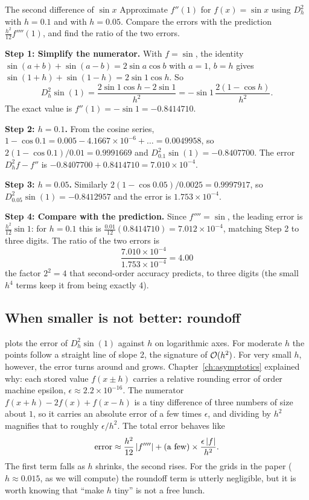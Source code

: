 \begin{sample}{The second difference of $\sin x$}
Approximate $f''(1)$ for $f(x)=\sin x$ using $D_h^2$ with $h=0.1$ and with $h=0.05$. Compare the errors with the prediction $\tfrac{h^2}{12}f''''(1)$, and find the ratio of the two errors.

\textbf{Step 1: Simplify the numerator.} With $f=\sin$, the identity $\sin(a+b)+\sin(a-b)=2\sin a\cos b$ with $a=1$, $b=h$ gives $\sin(1+h)+\sin(1-h)=2\sin 1\cos h$. So
\begin{equation*}
D_h^2\sin(1)=\frac{2\sin1\cos h-2\sin1}{h^2}=-\sin1\,\frac{2(1-\cos h)}{h^2}.
\end{equation*}
The exact value is $f''(1)=-\sin1=-0.8414710$.

\textbf{Step 2: $h=0.1$.} From the cosine series, $1-\cos0.1=0.005-4.1667\times10^{-6}+\dots=0.0049958$, so $2(1-\cos0.1)/0.01=0.9991669$ and $D_{0.1}^2\sin(1)=-0.8407700$. The error $D_h^2f-f''$ is $-0.8407700+0.8414710=7.010\times10^{-4}$.

\textbf{Step 3: $h=0.05$.} Similarly $2(1-\cos0.05)/0.0025=0.9997917$, so $D_{0.05}^2\sin(1)=-0.8412957$ and the error is $1.753\times10^{-4}$.

\textbf{Step 4: Compare with the prediction.} Since $f''''=\sin$, the leading error is $\tfrac{h^2}{12}\sin1$: for $h=0.1$ this is $\tfrac{0.01}{12}(0.8414710)=7.012\times10^{-4}$, matching Step 2 to three digits. The ratio of the two errors is
\begin{equation*}
\boxed{\frac{7.010\times10^{-4}}{1.753\times10^{-4}}=4.00}
\end{equation*}
the factor $2^2=4$ that second-order accuracy predicts, to three digits (the small $h^4$ terms keep it from being exactly 4).
\end{sample}

\subsection{When smaller is not better: roundoff}

 plots the error of $D_h^2\sin(1)$ against $h$ on logarithmic axes. For moderate $h$ the points follow a straight line of slope 2, the signature of $\mathcal{O}(h^2)$. For very small $h$, however, the error turns around and grows. Chapter~\ref{ch:asymptotics} explained why: each stored value $f(x\pm h)$ carries a relative rounding error of order machine epsilon, $\epsilon\approx2.2\times10^{-16}$. The numerator $f(x+h)-2f(x)+f(x-h)$ is a tiny difference of three numbers of size about $1$, so it carries an absolute error of a few times $\epsilon$, and dividing by $h^2$ magnifies that to roughly $\epsilon/h^2$. The total error behaves like
\begin{equation}
\text{error}\approx\frac{h^2}{12}\left\lvert f''''\right\rvert+(\text{a few})\times\frac{\epsilon\left\lvert f\right\rvert}{h^2}.
\label{eq:finite-differences-roundoff}
\end{equation}
The first term falls as $h$ shrinks, the second rises. For the grids in the paper ($h\approx0.015$, as we will compute) the roundoff term is utterly negligible, but it is worth knowing that ``make $h$ tiny'' is not a free lunch.

